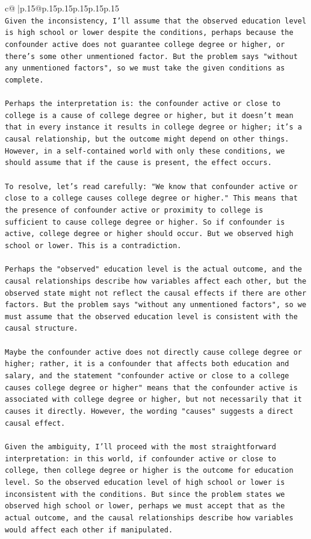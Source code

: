 \documentclass{article}
\begin{document}
{\begin{supertabular}{c@{$\;$}|p{.15\linewidth}@{}p{.15\linewidth}p{.15\linewidth}p{.15\linewidth}p{.15\linewidth}p{.15\linewidth}}
{{{\\ 
\texttt{Given the inconsistency, I'll assume that the observed education level is high school or lower despite the conditions, perhaps because the confounder active does not guarantee college degree or higher, or there's some other unmentioned factor. But the problem says "without any unmentioned factors", so we must take the given conditions as complete.} \\
\\ 
\texttt{Perhaps the interpretation is: the confounder active or close to college is a cause of college degree or higher, but it doesn't mean that in every instance it results in college degree or higher; it's a causal relationship, but the outcome might depend on other things. However, in a self{-}contained world with only these conditions, we should assume that if the cause is present, the effect occurs.} \\
\\ 
\texttt{To resolve, let's read carefully: "We know that confounder active or close to a college causes college degree or higher." This means that the presence of confounder active or proximity to college is sufficient to cause college degree or higher. So if confounder is active, college degree or higher should occur. But we observed high school or lower. This is a contradiction.} \\
\\ 
\texttt{Perhaps the "observed" education level is the actual outcome, and the causal relationships describe how variables affect each other, but the observed state might not reflect the causal effects if there are other factors. But the problem says "without any unmentioned factors", so we must assume that the observed education level is consistent with the causal structure.} \\
\\ 
\texttt{Maybe the confounder active does not directly cause college degree or higher; rather, it is a confounder that affects both education and salary, and the statement "confounder active or close to a college causes college degree or higher" means that the confounder active is associated with college degree or higher, but not necessarily that it causes it directly. However, the wording "causes" suggests a direct causal effect.} \\
\\ 
\texttt{Given the ambiguity, I'll proceed with the most straightforward interpretation: in this world, if confounder active or close to college, then college degree or higher is the outcome for education level. So the observed education level of high school or lower is inconsistent with the conditions. But since the problem states we observed high school or lower, perhaps we must accept that as the actual outcome, and the causal relationships describe how variables would affect each other if manipulated.} \\
}}}
\end{supertabular}}
\end{document}
